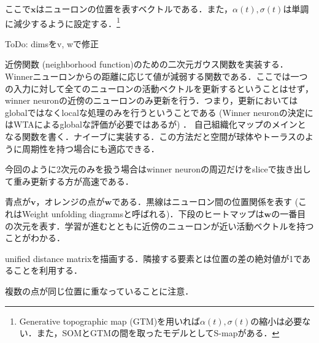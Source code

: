 ここで$\mathbf{x}$はニューロンの位置を表すベクトルである．また，$\alpha(t), \sigma(t)$は単調に減少するように設定する．\footnote{Generative topographic map (GTM)を用いれば$\alpha(t), \sigma(t)$の縮小は必要ない．また，SOMとGTMの間を取ったモデルとしてS-mapがある．}

ToDo: dimsをv, wで修正




近傍関数 (neighborhood function)のための二次元ガウス関数を実装する．Winnerニューロンからの距離に応じて値が減弱する関数である．ここでは一つの入力に対して全てのニューロンの活動ベクトルを更新するということはせず，winner neuronの近傍のニューロンのみ更新を行う．つまり，更新においてはglobalではなくlocalな処理のみを行うということである  (Winner neuronの決定にはWTAによるglobalな評価が必要ではあるが) ．
自己組織化マップのメインとなる関数を書く．ナイーブに実装する．この方法だと空間が球体やトーラスのように周期性を持つ場合にも適応できる．

今回のように2次元のみを扱う場合はwinner neuronの周辺だけをsliceで抜き出して重み更新する方が高速である．



青点が$\mathbf{v}$，オレンジの点が$\mathbf{w}$である．黒線はニューロン間の位置関係を表す (これはWeight unfolding diagramsと呼ばれる)．下段のヒートマップは$\mathbf{w}$の一番目の次元を表す．学習が進むとともに近傍のニューロンが近い活動ベクトルを持つことがわかる．



unified distance matrixを描画する．隣接する要素とは位置の差の絶対値が1であることを利用する．




複数の点が同じ位置に重なっていることに注意．


